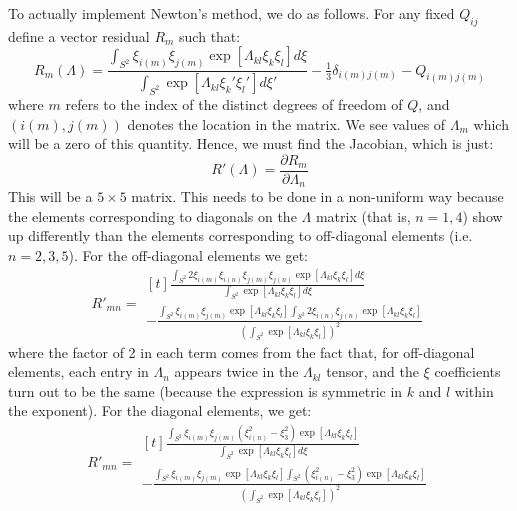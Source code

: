 \documentclass[reqno]{article}
\begin{document}
	To actually implement Newton's method, we do as follows.
	For any fixed $Q_{ij}$ define a vector residual $R_m$ such that:
	\begin{equation}
	R_m (\Lambda)
	= \frac{\int_{S^2} \xi_{i(m)} \xi_{j(m)} \exp\left[\Lambda_{kl} \xi_k \xi_l \right] d \xi}
	{\int_{S^2} \exp\left[\Lambda_{kl} \xi_k' \xi_l'\right] d\xi'}
	- \tfrac13 \delta_{i(m) j(m)}
	- Q_{i(m) j(m)}
	\end{equation}
	where $m$ refers to the index of the distinct degrees of freedom of $Q$, and $(i(m), j(m))$ denotes the location in the matrix.
	We see values of $\Lambda_m$ which will be a zero of this quantity.
	Hence, we must find the Jacobian, which is just:
	\begin{equation}
	R'(\Lambda) = \frac{\partial R_m}{\partial \Lambda_n}
	\end{equation}
	This will be a $5\times 5$ matrix.
	This needs to be done in a non-uniform way because the elements corresponding to diagonals on the $\Lambda$ matrix (that is, $n = 1, 4$) show up differently than the elements corresponding to off-diagonal elements (i.e. $n = 2, 3, 5$).
	For the off-diagonal elements we get:
	\begin{equation}
	R'_{mn}
	=
	\begin{multlined}[t]
	\frac{\int_{S^2} 2 \xi_{i(m)} \xi_{i(n)} \xi_{j(m)} \xi_{j(n)}
		\exp\left[\Lambda_{kl} \xi_k \xi_l\right] d\xi}
	{\int_{S^2} \exp\left[\Lambda_{kl} \xi_k \xi_l\right] d\xi} \\
	- \frac{\int_{S^2} \xi_{i(m)} \xi_{j(m)} 
		\exp\left[\Lambda_{kl} \xi_k \xi_l \right]
		\int_{S^2} 2 \xi_{i(n)} \xi_{j(n)}
		\exp\left[\Lambda_{kl} \xi_k \xi_l \right]}
	{\left(\int_{S^2} \exp\left[\Lambda_{kl} \xi_k \xi_l\right] \right)^2}
	\end{multlined}
	\end{equation}
	where the factor of 2 in each term comes from the fact that, for off-diagonal elements, each entry in $\Lambda_n$ appears twice in the $\Lambda_{kl}$ tensor, and the $\xi$ coefficients turn out to be the same (because the expression is symmetric in $k$ and $l$ within the exponent).
	For the diagonal elements, we get:
	\begin{equation}
	R'_{mn}
	= 
	\begin{multlined}[t]
	\frac{\int_{S^2} \xi_{i(m)} \xi_{j(m)} \left(\xi_{i(n)}^2 - \xi_3^2\right)
		\exp\left[\Lambda_{kl} \xi_k \xi_l\right]}
	{\int_{S^2} \exp\left[\Lambda_{kl} \xi_k \xi_l\right] d\xi} \\
	- \frac{\int_{S^2} \xi_{i(m)} \xi_{j(m)}
		\exp\left[\Lambda_{kl} \xi_k \xi_l\right]
		\int_{S^2} \left(\xi_{i(n)}^2 - \xi_3^2\right)
		\exp\left[\Lambda_{kl} \xi_k \xi_l\right]}
	{\left(\int_{S^2} \exp\left[\Lambda_{kl} \xi_k \xi_l \right] \right)^2}
	\end{multlined}
	\end{equation}
\end{document}
